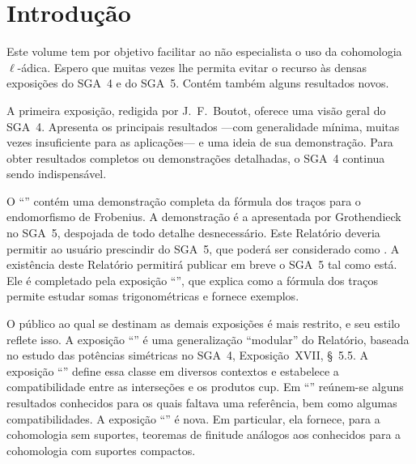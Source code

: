 
\chapter*{Introdução}

Este volume tem por objetivo facilitar ao não especialista o uso da
cohomologia $\ell$-ádica. Espero que muitas vezes lhe permita evitar o recurso
às densas exposições do SGA~4 e do SGA~5. Contém também alguns resultados
novos.

A primeira exposição, redigida por J.~F.~Boutot, oferece uma visão geral do
SGA~4. Apresenta os principais resultados ---com generalidade mínima, muitas
vezes insuficiente para as aplicações--- e uma ideia de sua demonstração.
Para obter resultados completos ou demonstrações detalhadas, o SGA~4 continua
sendo indispensável.

O ``'' contém uma demonstração completa da fórmula dos traços para
o endomorfismo de Frobenius. A demonstração é a apresentada por Grothendieck
no SGA~5, despojada de todo detalhe desnecessário.
Este Relatório deveria permitir ao usuário prescindir do SGA~5, que poderá ser
considerado como
.
A existência deste Relatório permitirá publicar em breve o SGA~5 tal como está.
Ele é completado pela exposição ``'', que explica como a fórmula
dos traços permite estudar somas trigonométricas e fornece exemplos.

O público ao qual se destinam as demais exposições é mais restrito, e seu
estilo reflete isso. A exposição ``'' é uma generalização
``modular'' do Relatório, baseada no estudo das potências simétricas no SGA~4,
Exposição~XVII, \S~5.5.
A exposição ``'' define essa classe em diversos contextos e
estabelece a compatibilidade entre as interseções e os produtos cup. Em
``'' reúnem-se alguns resultados conhecidos para os quais faltava
uma referência, bem como algumas compatibilidades. A exposição
``'' é nova. Em particular, ela fornece, para a cohomologia sem
suportes, teoremas de finitude análogos aos conhecidos para a cohomologia com
suportes compactos.

